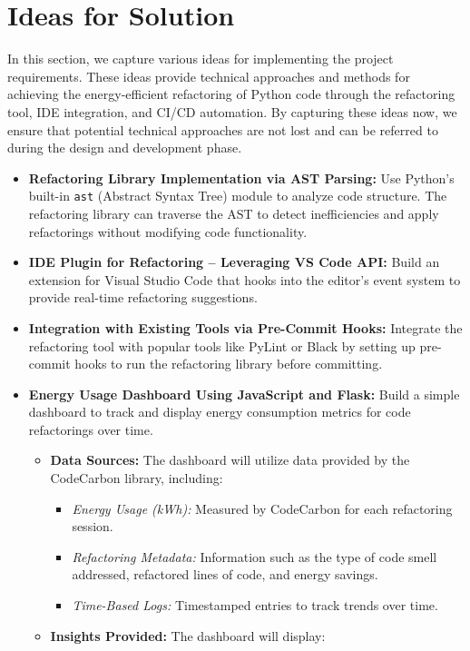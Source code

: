\documentclass[12pt]{article}
\begin{document}
\section{Ideas for Solution}
In this section, we capture various ideas for implementing the project requirements. These ideas provide technical approaches and methods for achieving the energy-efficient refactoring of Python code through the refactoring tool, IDE integration, and CI/CD automation. By capturing these ideas now, we ensure that potential technical approaches are not lost and can be referred to during the design and development phase.
\begin{itemize}
    \item \textbf{Refactoring Library Implementation via AST Parsing:} 
    Use Python’s built-in \texttt{ast} (Abstract Syntax Tree) module to analyze code structure. The refactoring library can traverse the AST to detect inefficiencies and apply refactorings without modifying code functionality.
    \item \textbf{IDE Plugin for Refactoring – Leveraging VS Code API:} 
    Build an extension for Visual Studio Code that hooks into the editor’s event system to provide real-time refactoring suggestions.
    \item \textbf{Integration with Existing Tools via Pre-Commit Hooks:} 
    Integrate the refactoring tool with popular tools like PyLint or Black by setting up pre-commit hooks to run the refactoring library before committing.
    \item \textbf{Energy Usage Dashboard Using JavaScript and Flask:} 
    Build a simple dashboard to track and display energy consumption metrics for code refactorings over time. 
    \begin{itemize}
        \item \textbf{Data Sources:} The dashboard will utilize data provided by the CodeCarbon library, including:
        \begin{itemize}
            \item \textit{Energy Usage (kWh):} Measured by CodeCarbon for each refactoring session.
            \item \textit{Refactoring Metadata:} Information such as the type of code smell addressed, refactored lines of code, and energy savings.
            \item \textit{Time-Based Logs:} Timestamped entries to track trends over time.
        \end{itemize}
        \item \textbf{Insights Provided:} The dashboard will display:

\end{itemize}
\end{itemize}
\end{document}
